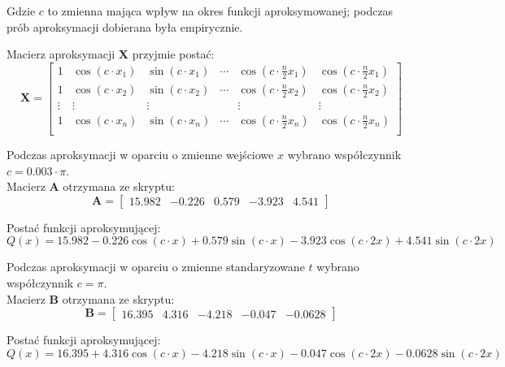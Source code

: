 \documentclass[a4paper, 12pt]{mwart}
\begin{document}
				Gdzie $c$ to zmienna mająca wpływ na okres funkcji aproksymowanej; podczas prób
				aproksymacji dobierana była empirycznie.

				Macierz aproksymacji $\textbf{X}$ przyjmie postać:
				$$\textbf{X} = \begin{bmatrix}
					1     & \cos(c\cdot x_1) & \sin(c\cdot x_1) & \cdots & \cos(c\cdot \frac{n}{2} x_1) & \cos(c\cdot \frac{n}{2} x_1)\\
					1     & \cos(c\cdot x_2) & \sin(c\cdot x_2) & \cdots & \cos(c\cdot \frac{n}{2} x_2) & \cos(c\cdot \frac{n}{2} x_2)\\
					\vdots& \vdots & \vdots &  & \vdots & \vdots\\
					1     & \cos(c\cdot x_n) & \sin(c\cdot x_n) & \cdots & \cos(c\cdot \frac{n}{2} x_n) & \cos(c\cdot \frac{n}{2} x_n)\\
				\end{bmatrix}$$

				Podczas aproksymacji w oparciu o zmienne wejściowe
				$x$ wybrano współczynnik $c=0.003\cdot \pi$. \\Macierz $\textbf{A}$ otrzymana ze skryptu:
				$$\textbf{A} = \begin{bmatrix}
					15.982 &
					-0.226 &
					0.579 &
					-3.923 &
					4.541
				\end{bmatrix}$$

				Postać funkcji aproksymującej:
				$$Q(x) = 15.982 -0.226 \cos\left(c\cdot x\right) + 0.579 \sin \left(c\cdot x\right)
				- 3.923 \cos \left(c\cdot 2x\right) + 4.541 \sin \left(c \cdot 2x\right)$$

				Podczas aproksymacji w oparciu o zmienne standaryzowane $t$ wybrano współczynnik 
				$c=\pi$. \\Macierz $\textbf{B}$ otrzymana ze skryptu:
				$$\textbf{B} = \begin{bmatrix}
					16.395 &
					4.316 &
					-4.218 &
					-0.047 &
					-0.0628
				\end{bmatrix}$$

				Postać funkcji aproksymującej:
				$$Q(x) = 16.395 + 4.316 \cos\left(c\cdot x\right) -4.218 \sin \left(c\cdot x\right)
				-0.047 \cos \left(c\cdot 2x\right) -0.0628 \sin \left(c \cdot 2x\right)$$
			\newpage
\end{document}
